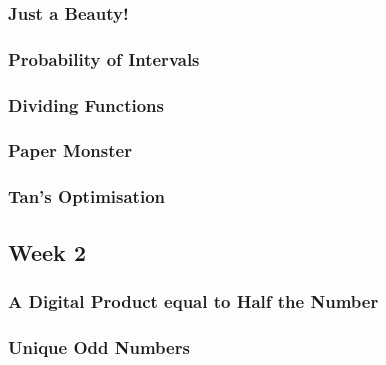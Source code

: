 \documentclass[titlepage=true]{scrartcl}
\begin{document}
        \subsubsection{Just a Beauty!}
            \label{7-1-3}  
            
        \newpage

        \subsubsection{Probability of Intervals}
            \label{7-1-4}  
            
        \newpage

        \subsubsection{Dividing Functions}
            \label{7-1-5}  
            
        \newpage

        \subsubsection{Paper Monster}
            \label{7-1-6}  
            
        \newpage
        
        \subsubsection{Tan's Optimisation}
            \label{7-1-7}  
            
        \newpage
        
    \subsection{Week 2}
        
        \subsubsection{A Digital Product equal to Half the Number}
        	\label{7-2-1}  
        	
        \newpage
        
        \subsubsection{Unique Odd Numbers}
        	\label{7-2-2}  
        	
        \newpage
\end{document}
